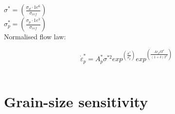 \documentclass[]{scrreprt}
\begin{document}
$\sigma^* = \left(\frac{\sigma_d\cdot1e^6}{\sigma_{ref}}\right)$\\

$\sigma_p^* =  \left(\frac{\sigma_p\cdot1e^3}{\sigma_{ref}}\right)$\\

Normalised flow law:

\begin{equation}
 \label{eq:norm_dislocation_creep}
\dot{\varepsilon}_{p}^* = A_{p}^* \sigma^{*2} exp^{\left(\frac{\sigma^{*}}{\sigma_p^*}\right)} exp^{\left(\frac{Ar_{p} \delta T^*}{\left(1+\delta\right)T^*}\right)}
\end{equation}\\


\chapter{Grain-size sensitivity}
\label{chapter:size_sensitivity}
\end{document}
